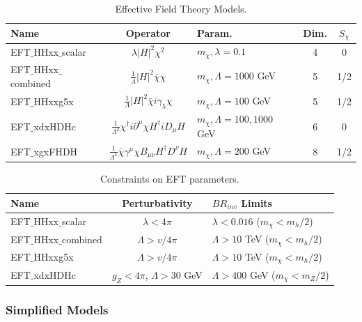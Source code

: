 \begin{table}[htbH]
\begin{center}
\begin{tabular}{ l | c | l | c | c}
\hline
Name & Operator & Param. & Dim. & $S_{\chi}$ \\
\hline
EFT$\_$HHxx$\_$scalar & $\lambda |H|^{2} \chi^{2}$ & $m_{\chi}, \lambda = 0.1$ & 4 & 0 \\
EFT$\_$HHxx$\_$combined & $\frac{1}{\Lambda} |H|^{2} \bar{\chi} \chi$ & $m_{\chi}, \Lambda = 1000$ GeV & 5 & 1/2 \\
EFT$\_$HHxxg5x & $\frac{1}{\Lambda} |H|^{2} \bar{\chi} i \gamma_{5} \chi$ & $m_{\chi}, \Lambda = 100$ GeV & 5 & 1/2\\
EFT$\_$xdxHDHc & $\frac{1}{\Lambda^{2}} \chi^{\dag} i \partial^{\mu} \chi H^{\dag} i D_{\mu} H $ & $m_{\chi}, \Lambda = 100,1000$ GeV & 6 & 0\\
EFT$\_$xgxFHDH & $\frac{1}{\Lambda^{4}} \bar{\chi} \gamma^{\mu} \chi B_{\mu\nu} H^{\dag} D^{\nu} H$ & $m_{\chi}, \Lambda = 200$ GeV & 8 & 1/2\\
\hline
\end{tabular}
\caption{Effective Field Theory Models.}\label{tab:efts}
\end{center}
\end{table}

\begin{table}[htbH]
\begin{center}
\begin{tabular}{ l | c | l}
\hline
Name & Perturbativity & $BR_{inv}$ Limits \\
\hline
EFT$\_$HHxx$\_$scalar & $\lambda < 4\pi$ & $\lambda < 0.016$ ($m_\chi < m_h/2$)\\
EFT$\_$HHxx$\_$combined & $\Lambda > v/4\pi $ & $\Lambda > 10$ TeV ($m_\chi < m_h/2$)\\
EFT$\_$HHxxg5x & $\Lambda > v/4\pi $ & $\Lambda > 10$ TeV ($m_\chi < m_h/2$) \\
EFT$\_$xdxHDHc & $g_Z < 4\pi$, $\Lambda > 30$ GeV & $\Lambda > 400$ GeV ($m_\chi < m_Z/2$) \\
\hline
\end{tabular}
\caption{Constraints on EFT parameters.}\label{tab:eftlims}
\end{center}
\end{table}

\subsubsection{Simplified Models}

